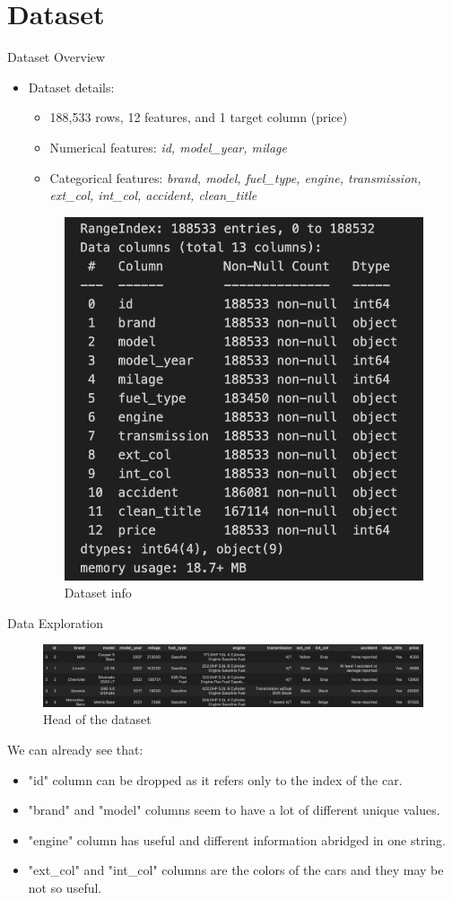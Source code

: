 \documentclass{beamer}
\begin{document}
\section{Dataset}
\begin{frame}{Dataset Overview}
\begin{itemize}
    \item Dataset details:
        \begin{itemize}
            \item 188,533 rows, 12 features, and 1 target column (price)
            \item Numerical features: \textit{id, model\_year, milage}
            \item Categorical features: \textit{brand, model, fuel\_type, engine, transmission, ext\_col, int\_col, accident, clean\_title}
        \end{itemize}
        \begin{figure}
            \centering
            \includegraphics[width=0.3\linewidth]{images/dataset_info.png}
            \caption{Dataset info}
            \label{fig:enter-label}
        \end{figure}
\end{itemize}
\end{frame}

\begin{frame}{Data Exploration}
    \begin{figure}
        \centering
        \includegraphics[width=1\linewidth]{images/data_head_initial.png}
        \caption{Head of the dataset}
        \label{fig:enter-label}
    \end{figure}
    We can already see that:
    \begin{itemize}
        \item "id" column can be dropped as it refers only to the index of the car.
        \item "brand" and "model" columns seem to have a lot of different unique values.
        \item "engine" column has useful and different information abridged in one string.
        \item "ext\_col" and "int\_col" columns are the colors of the cars and they may be not so useful.
    \end{itemize}
\end{frame}
\end{document}
